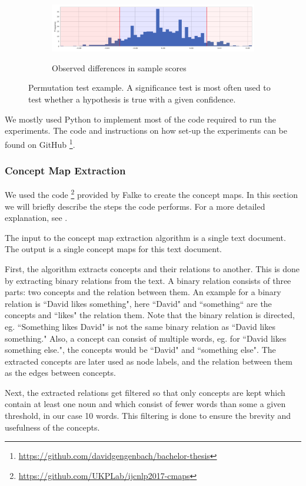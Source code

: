 \begin{figure}[ht]
  \begin{subfigure}[t]{\linewidth}
  {\includegraphics[width=1\textwidth]{assets/figures/permutation_test/distribution.pdf}\label{fig:permutation_test_distribution}}
  \caption{Observed differences in sample scores}
  \end{subfigure}
  \caption{Permutation test example. A significance test is most often used to test whether a hypothesis is true with a given confidence.}
  \label{fig:example_permutation_test}
\end{figure}


We mostly used Python to implement most of the code required to run the experiments.
The code and instructions on how set-up the experiments can be found on GitHub \footnote{\url{https://github.com/davidgengenbach/bachelor-thesis}}.

\subsubsection{Concept Map Extraction}
We used the code \footnote{\url{https://github.com/UKPLab/ijcnlp2017-cmaps}} provided by Falke \cite{Falke2017} to create the concept maps.
In this section we will briefly describe the steps the code performs. For a more detailed explanation, see \cite{Falke2017}.

The input to the concept map extraction algorithm is a single text document. The output is a single concept maps for this text document.

First, the algorithm extracts concepts and their relations to another.
This is done by extracting binary relations from the text. A binary relation consists of three parts: two concepts and the relation between them. An example for a binary relation is ``David likes something", here ``David" and ``something`` are the concepts and ``likes" the relation them. Note that the binary relation is directed, eg. ``Something likes David" is not the same binary relation as ``David likes something."
Also, a concept can consist of multiple words, eg. for ``David likes something else.", the concepts would be ``David" and ``something else".
The extracted concepts are later used as node labels, and the relation between them as the edges between concepts.

Next, the extracted relations get filtered so that only concepts are kept which contain at least one noun and which consist of fewer words than some a given threshold, in our case 10 words. This filtering is done to ensure the brevity and usefulness of the concepts.
